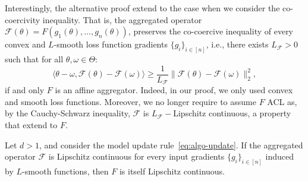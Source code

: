 \documentclass[twoside,11pt]{article}
\newcommand{\F}{\mathcal{F}}
\begin{document}
Interestingly, the alternative proof extend to the case when we consider the co-coercivity inequality. 
That is, the aggregated operator $\F(\theta) = F(g_1(\theta), \ldots, g_n(\theta))$, preserves the co-coercive inequality of every convex and $L$-smooth loss function gradients $\{ g_i \}_{i \in [n]}$, i.e., there exists $L_\F > 0$ such that for all $\theta, \omega \in \Theta$:
\begin{equation*}
	\langle \theta - \omega, \F(\theta) - \F(\omega) \rangle \geq \frac{1}{L_\F} \| \F(\theta) - \F(\omega) \|_2^2,
\end{equation*} 
if and only $F$ is an affine aggregator.
Indeed, in our proof, we only used convex and smooth loss functions. Moreover, we no longer require to assume $F$ ACL as, by the Cauchy-Schwarz inequality, $\F$ is $L_\F-$Lipschitz continuous, a property that extend to $F$.
\begin{lemma}\label{lem:lipschitz-from-F}
    Let $d>1$, and consider the model update rule~\eqref{eq:algo-update}.
    If the aggregated operator $\F$ is Lipschitz continuous for every input gradients $\{ g_i \}_{i \in [n]}$ induced by $L$-smooth functions,
    then $F$ is itself Lipschitz continuous. 
\end{lemma}
\end{document}
